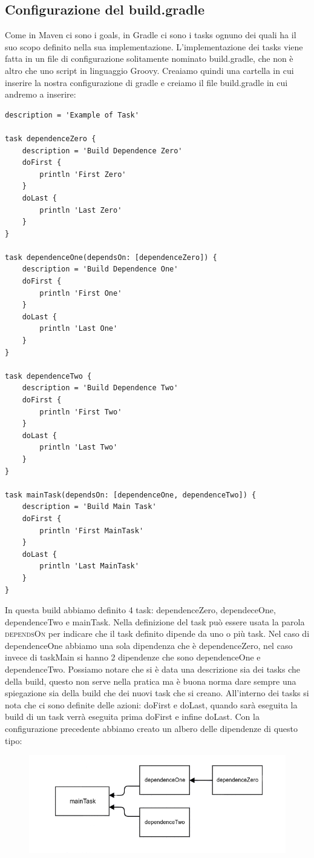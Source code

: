 \subsection{Configurazione del build.gradle}
\label{buildGradle}
Come in Maven ci sono i goals, in Gradle ci sono i tasks ognuno dei quali ha il suo scopo definito nella sua implementazione. L'implementazione dei tasks viene fatta in un file di configurazione solitamente nominato build.gradle, che non è altro che uno script in linguaggio Groovy. Creaiamo quindi una cartella in cui inserire la nostra configurazione di gradle e creiamo il file build.gradle in cui andremo a inserire:
\begin{lstlisting}[frame=single]
description = 'Example of Task'

task dependenceZero {
	description = 'Build Dependence Zero'
	doFirst {
		println 'First Zero'
	}
	doLast {
		println 'Last Zero'
	}
}

task dependenceOne(dependsOn: [dependenceZero]) {
	description = 'Build Dependence One'
	doFirst {
		println 'First One'
	}
	doLast {
		println 'Last One'
	}
}

task dependenceTwo {
	description = 'Build Dependence Two'
	doFirst {
		println 'First Two'
	}
	doLast {
		println 'Last Two'
	}
}

task mainTask(dependsOn: [dependenceOne, dependenceTwo]) {
	description = 'Build Main Task'
	doFirst {
		println 'First MainTask'
	}
	doLast {
		println 'Last MainTask'
	}
}
\end{lstlisting}
In questa build abbiamo definito 4 task: dependenceZero, dependeceOne, dependenceTwo e mainTask. Nella definizione del task può essere usata la parola \textsc{dependsOn} per indicare che il task definito dipende da uno o più task. Nel caso di dependenceOne abbiamo una sola dipendenza che è dependenceZero, nel caso invece di taskMain si hanno 2 dipendenze che sono dependenceOne e dependenceTwo. Possiamo notare che si è data una descrizione sia dei tasks che della build, questo non serve nella pratica ma è buona norma dare sempre una spiegazione sia della build che dei nuovi task che si creano. All'interno dei tasks si nota che ci sono definite delle azioni: doFirst e doLast, quando sarà eseguita la build di un task verrà eseguita prima doFirst e infine doLast. Con la configurazione precedente abbiamo creato un albero delle dipendenze di questo tipo:
\begin{figure}[H]
\includegraphics[scale=0.40]{HowToUse/1Task/task_taskDep/graphDep.png}
\end{figure}
